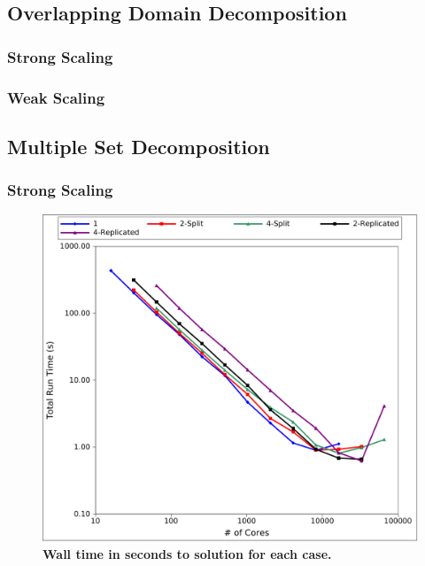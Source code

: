 \clearpage

\subsection{Overlapping Domain Decomposition}
\label{subsec:overlapping_domain_decomp}

\subsubsection{Strong Scaling}
\label{subsubsec:overlapping_strong}

\clearpage

\subsubsection{Weak Scaling}
\label{subsubsec:overlapping_weak}

\clearpage

\subsection{Multiple Set Decomposition}
\label{subsec:msod_decomposition}

\subsubsection{Strong Scaling}
\label{subsubsec:msod_strong}

\begin{figure}[htpb!]
  \begin{center}
    \includegraphics[width=6in]{chapters/parallel_mc/titan_strong_ms_time.pdf}
  \end{center}
  \caption{\textbf{Wall time in seconds to solution for each case.}}
  \label{fig:titan_strong_ms_time}
\end{figure}

